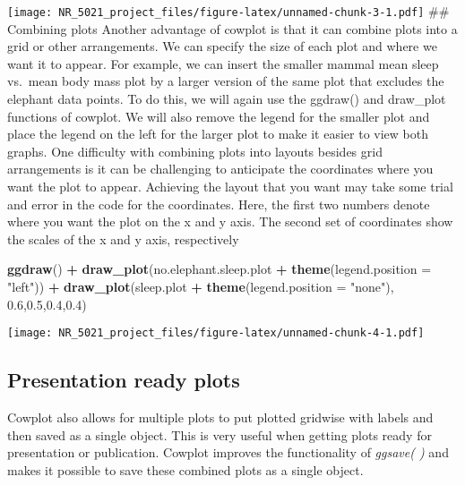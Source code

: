 \documentclass[]{article}
\newenvironment{Shaded}{\begin{snugshade}}{\end{snugshade}}
\newcommand{\KeywordTok}[1]{\textcolor[rgb]{0.13,0.29,0.53}{\textbf{#1}}}
\newcommand{\DataTypeTok}[1]{\textcolor[rgb]{0.13,0.29,0.53}{#1}}
\newcommand{\FloatTok}[1]{\textcolor[rgb]{0.00,0.00,0.81}{#1}}
\newcommand{\StringTok}[1]{\textcolor[rgb]{0.31,0.60,0.02}{#1}}
\newcommand{\OperatorTok}[1]{\textcolor[rgb]{0.81,0.36,0.00}{\textbf{#1}}}
\newcommand{\NormalTok}[1]{#1}
\begin{document}
\texttt{[image: NR\_5021\_project\_files/figure-latex/unnamed-chunk-3-1.pdf]}
\#\# Combining plots Another advantage of cowplot is that it can combine
plots into a grid or other arrangements. We can specify the size of each
plot and where we want it to appear. For example, we can insert the
smaller mammal mean sleep vs.~mean body mass plot by a larger version of
the same plot that excludes the elephant data points. To do this, we
will again use the ggdraw() and draw\_plot functions of cowplot. We will
also remove the legend for the smaller plot and place the legend on the
left for the larger plot to make it easier to view both graphs. One
difficulty with combining plots into layouts besides grid arrangements
is it can be challenging to anticipate the coordinates where you want
the plot to appear. Achieving the layout that you want may take some
trial and error in the code for the coordinates. Here, the first two
numbers denote where you want the plot on the x and y axis. The second
set of coordinates show the scales of the x and y axis, respectively

\begin{Shaded}
\begin{Highlighting}[]
\KeywordTok{ggdraw}\NormalTok{() }\OperatorTok{+}\StringTok{ }\KeywordTok{draw_plot}\NormalTok{(no.elephant.sleep.plot }\OperatorTok{+}\StringTok{ }\KeywordTok{theme}\NormalTok{(}\DataTypeTok{legend.position =} \StringTok{"left"}\NormalTok{)) }\OperatorTok{+}\StringTok{ }\KeywordTok{draw_plot}\NormalTok{(sleep.plot }\OperatorTok{+}\StringTok{ }\KeywordTok{theme}\NormalTok{(}\DataTypeTok{legend.position =} \StringTok{"none"}\NormalTok{), }\FloatTok{0.6}\NormalTok{,}\FloatTok{0.5}\NormalTok{,}\FloatTok{0.4}\NormalTok{,}\FloatTok{0.4}\NormalTok{)}
\end{Highlighting}
\end{Shaded}

\texttt{[image: NR\_5021\_project\_files/figure-latex/unnamed-chunk-4-1.pdf]}

\subsection{Presentation ready plots}\label{presentation-ready-plots}

Cowplot also allows for multiple plots to put plotted gridwise with
labels and then saved as a single object. This is very useful when
getting plots ready for presentation or publication. Cowplot improves
the functionality of \emph{ggsave( )} and makes it possible to save
these combined plots as a single object.
\end{document}
